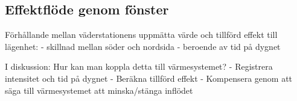 \subsection{Effektflöde genom fönster}

Förhållande mellan väderstationens uppmätta värde och tillförd effekt till lägenhet:
- skillnad mellan söder och nordsida
- beroende av tid på dygnet

I diskussion:
Hur kan man koppla detta till värmesystemet?
- Registrera intensitet och tid på dygnet
- Beräkna tillförd effekt
- Kompensera genom att säga till värmesystemet att minska/stänga inflödet